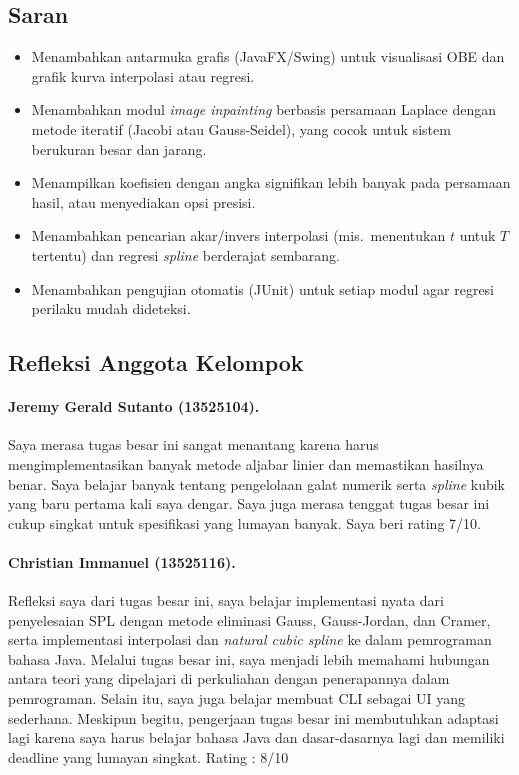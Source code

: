 \documentclass[12pt,a4paper]{article}
\begin{document}
\subsection{Saran}
\begin{itemize}
  \item Menambahkan antarmuka grafis (JavaFX/Swing) untuk visualisasi OBE dan grafik kurva interpolasi atau regresi.
  \item Menambahkan modul \textit{image inpainting} berbasis persamaan Laplace dengan metode iteratif (Jacobi atau Gauss-Seidel), yang cocok untuk sistem berukuran besar dan jarang.
  \item Menampilkan koefisien dengan angka signifikan lebih banyak pada persamaan hasil, atau menyediakan opsi presisi.
  \item Menambahkan pencarian akar/invers interpolasi (mis.\ menentukan $t$ untuk $T$ tertentu) dan regresi \textit{spline} berderajat sembarang.
  \item Menambahkan pengujian otomatis (JUnit) untuk setiap modul agar regresi perilaku mudah dideteksi.
\end{itemize}

\subsection{Refleksi Anggota Kelompok}
\paragraph{Jeremy Gerald Sutanto (13525104).}
Saya merasa tugas besar ini sangat menantang karena harus mengimplementasikan banyak metode aljabar linier dan memastikan hasilnya benar. Saya belajar banyak tentang pengelolaan galat numerik serta \textit{spline} kubik yang baru pertama kali saya dengar. Saya juga merasa tenggat tugas besar ini cukup singkat untuk spesifikasi yang lumayan banyak. Saya beri rating 7/10.

\paragraph{Christian Immanuel (13525116).}
Refleksi saya dari tugas besar ini, saya belajar implementasi nyata dari penyelesaian SPL dengan metode eliminasi Gauss, Gauss-Jordan, dan Cramer, serta implementasi interpolasi dan \textit{natural cubic spline} ke dalam pemrograman bahasa Java. Melalui tugas besar ini, saya menjadi lebih memahami hubungan antara teori yang dipelajari di perkuliahan dengan penerapannya dalam pemrograman. Selain itu, saya juga belajar membuat CLI sebagai UI yang sederhana. Meskipun begitu, pengerjaan tugas besar ini membutuhkan adaptasi lagi karena saya harus belajar bahasa Java dan dasar-dasarnya lagi dan memiliki deadline yang lumayan singkat. Rating : 8/10
\end{document}
